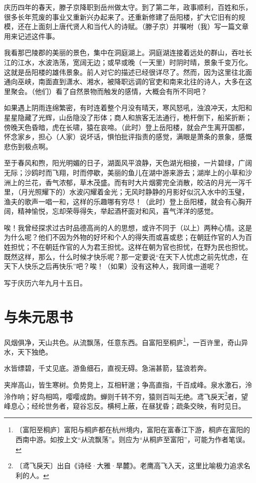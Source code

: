 \documentclass[12pt,UTF-8,openany,a4]{ctexbook}
\begin{document}
\begin{large}\yiwen
    
    庆历四年的春天，滕子京降职到岳州做太守。到了第二年，政事顺利，百姓和乐，很多长年荒废的事业又重新兴办起来了。还重新修建了岳阳楼，扩大它旧有的规模，还在上面刻上唐代贤人和当代人的诗赋。（滕子京）并嘱咐（我）写一篇文章用来记述这件事。
    
    我看那巴陵郡的美丽的景色，集中在洞庭湖上。洞庭湖连接着远处的群山，吞吐长江的江水，水波浩荡，宽阔无边；或早或晚（一天里）时阴时晴，景象千变万化。这就是岳阳楼的雄伟景象。前人对它的描述已经很详尽了。然而，因为这里往北面通向巫峡，南面直到潇水、湘水，被降职远调的官吏和南来北往的诗人，大多在这里聚会。（他们）看了自然景物而触发的感情，大概会有所不同吧？
    
    如果遇上阴雨连绵繁密，有时连着整个月没有晴天，寒风怒吼，浊浪冲天，太阳和星星隐藏了光辉，山岳隐没了形体；商人和旅客无法通行，桅杆倒下，船桨折断；傍晚天色昏暗，虎在长啸，猿在哀啼。（此时）登上岳阳楼，就会产生离开国都，怀念家乡，担心（人家）说坏话，惧怕批评指责的感觉，满眼是萧条的景象，感慨悲伤到极点啊。
    
    至于春风和煦，阳光明媚的日子，湖面风平浪静，天色湖光相接，一片碧绿，广阔无际；沙鸥时而飞翔，时而停歇，美丽的鱼儿在湖中游来游去；湖岸上的小草和沙洲上的兰花，香气浓郁，草木茂盛。而有时大片烟雾完全消散，皎洁的月光一泻千里，（月光照耀下的）水波闪耀着金光；无风时静静的月影好似沉入水中的玉璧，渔夫的歌声一唱一和，这样的乐趣哪有穷尽！（此时）登上岳阳楼，就会有心胸开阔，精神愉悦，忘却荣辱得失，举起酒杯面对和风，喜气洋洋的感觉。
    
    唉！我曾经探求过古时品德高尚的人的思想，或许不同于（以上）两种心情。这是为什么呢？他们不因为外物的好坏和个人的得失而或喜或悲；在朝廷作官的人为百姓担忧；不在朝廷作官的人为君王担忧。这样在朝为官也担忧，在野为民也担忧。既然这样，那么，什么时候才快乐呢？那一定要说“在天下人忧虑之前先忧虑，在天下人快乐之后再快乐”吧？唉！（如果）没有这种人，我同谁一道呢？
    
    写于庆历六年九月十五日。
    

\end{large}



\chapter{与朱元思书}

\begin{large}
    
    风烟俱净，天山共色。从流飘荡，任意东西。自富阳至桐庐\footnote{〔富阳至桐庐〕\yiwen 富阳与桐庐都在杭州境内，富阳在富春江下游，桐庐在富阳的西南中游。如按上文“从流飘荡”。则应为“从桐庐至富阳”，可能为作者笔误。}，一百许里，奇山异水，天下独绝。
    
    水皆缥碧，千丈见底。游鱼细石，直视无碍。急湍甚箭，猛浪若奔。
    
    夹岸高山，皆生寒树。负势竞上，互相轩邈；争高直指，千百成峰。泉水激石，泠泠作响；好鸟相鸣，嘤嘤成韵。蝉则千转不穷，猿则百叫无绝。鸢飞戾天\footnote{〔鸢飞戾天〕\yiwen 出自《诗经·大雅·旱麓》。老鹰高飞入天，这里比喻极力追求名利的人。}者，望峰息心；经纶世务者，窥谷忘反。横柯上蔽，在昼犹昏；疏条交映，有时见日。

\end{large}
\end{document}
